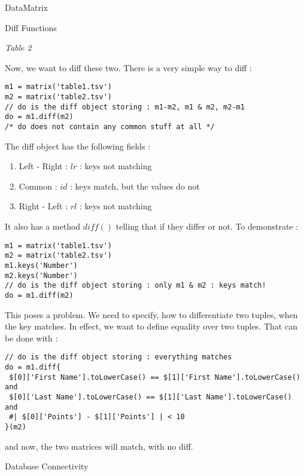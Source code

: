 \begin{section}{DataMatrix}
\begin{subsection}{Diff Functions}
\begin{center}
\emph{ Table 2 }

\end{center}

Now, we want to diff these two. There is a very simple way to diff :

\begin{lstlisting}[style=JexlStyle]
m1 = matrix('table1.tsv')
m2 = matrix('table2.tsv')
// do is the diff object storing : m1-m2, m1 & m2, m2-m1 
do = m1.diff(m2)
/* do does not contain any common stuff at all */
\end{lstlisting}

The diff object has the following fields :
\begin{enumerate}
\item{Left - Right : $lr$ : keys not matching }
\item{Common : $id$ : keys match, but the values do not}
\item{Right - Left : $rl$ : keys not matching }
\end{enumerate}
It also has a method $diff()$ telling that if they differ or not. 
To demonstrate :

\begin{lstlisting}[style=JexlStyle]
m1 = matrix('table1.tsv')
m2 = matrix('table2.tsv')
m1.keys('Number')
m2.keys('Number')
// do is the diff object storing : only m1 & m2 : keys match! 
do = m1.diff(m2)
\end{lstlisting}

This poses a problem. We need to specify, how to differentiate two tuples, 
when the key matches. In effect, we want to define equality over two tuples.
That can be done with :

\begin{lstlisting}[style=JexlStyle]
// do is the diff object storing : everything matches 
do = m1.diff{    
 $[0]['First Name'].toLowerCase() == $[1]['First Name'].toLowerCase() and 
 $[0]['Last Name'].toLowerCase() == $[1]['Last Name'].toLowerCase() and 
 #| $[0]['Points'] - $[1]['Points'] | < 10   
}(m2)
\end{lstlisting}
and now, the two matrices will match, with no diff.


\end{subsection}


\end{section}

\begin{section}{Database Connectivity}
\end{section}
